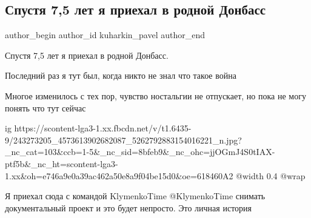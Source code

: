  
 
 
 
 
 
\subsection{Спустя 7,5 лет я приехал в родной Донбасс}
\label{sec:27_09_2021.fb.kuharkin_pavel.1.donbass_poezdka}
 
\ifcmt
 author_begin
   author_id kuharkin_pavel
 author_end
\fi

Спустя 7,5 лет я приехал в родной Донбасс. 

Последний раз я тут был, когда никто не знал что такое война

Многое изменилось с тех пор, чувство ностальгии не отпускает, но пока не могу
понять что тут сейчас

\ifcmt
  ig https://scontent-lga3-1.xx.fbcdn.net/v/t1.6435-9/243273205_4573613902682087_5262792883154016221_n.jpg?_nc_cat=103&ccb=1-5&_nc_sid=8bfeb9&_nc_ohc=jjOGmJ4S0tIAX-ptf5b&_nc_ht=scontent-lga3-1.xx&oh=e746a9e0a39ac462a50e8a9f04be15d0&oe=618460A2
  @width 0.4
  @wrap 
\fi
 
Я приехал сюда с командой KlymenkoTime @KlymenkoTime снимать документальный
проект и это будет непросто. Это личная история


